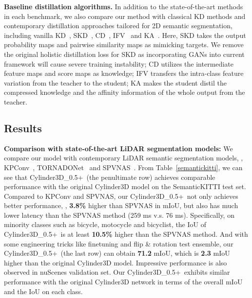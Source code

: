 \noindent \textbf{Baseline distillation algorithms.} In addition to the state-of-the-art methods in each benchmark, we also compare our method with classical KD methods and contemporary distillation approaches tailored for 2D semantic segmentation, including vanilla KD~\cite{hinton2015distilling}, SKD~\cite{liu2019structured}, CD~\cite{shu2020channel}, IFV~\cite{wang2020intra} and KA~\cite{he2019knowledge}. Here, SKD takes the output probability maps and pairwise similarity maps as mimicking targets. We remove the original holistic distillation loss for SKD as incorporating GANs into current framework will cause severe training instability; CD utilizes the intermediate feature maps and score maps as knowledge; IFV transfers the intra-class feature variation from the teacher to the student; KA makes the student distil the compressed knowledge and the affinity information of the whole output from the teacher.



\subsection{Results}



\noindent \textbf{Comparison with state-of-the-art LiDAR segmentation models:} We compare our model with contemporary LiDAR semantic segmentation models, \eg, KPConv~\cite{thomas2019kpconv}, TORNADONet~\cite{gerdzhev2021tornado} and SPVNAS~\cite{tang2020searching}. From Table~\ref{semantickitti}, we can see that Cylinder3D\_0.5+\algorithmname~(the penultimate row) achieves comparable performance with the original Cylinder3D model on the SemanticKITTI test set. Compared to KPConv and SPVNAS, our Cylinder3D\_0.5+\algorithmname~not only achieves better performance, \eg, \textbf{3.8\%} higher than SPVNAS in mIoU, but also has much lower latency than the SPVNAS method (259 ms v.s. 76 ms). Specifically, on minority classes such as bicycle, motocycle and bicyclist, the IoU of Cylinder3D\_0.5+\algorithmname~is at least \textbf{10.5\%} higher than the SPVNAS method. And with some engineering tricks like finetuning and flip \& rotation test ensemble, our Cylinder3D\_0.5+\algorithmname~(the last row) can obtain \textbf{71.2} mIoU, which is \textbf{2.3} mIoU higher than the original Cylinder3D model. Impressive performance is also observed in nuScenes validation set. Our Cylinder3D\_0.5+\algorithmname~exhibits similar performance with the original Cylinder3D network in terms of the overall mIoU and the IoU on each class.

